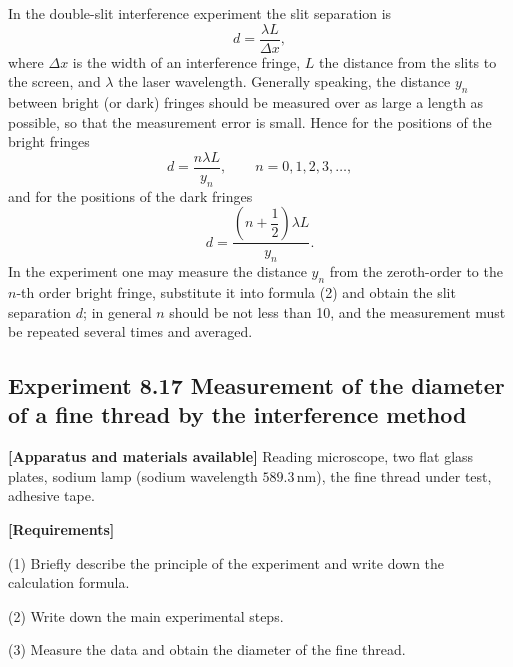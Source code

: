 In the double-slit interference experiment the slit separation is
\begin{equation}
d=\frac{\lambda L}{\Delta x}, \tag{1}
\end{equation}
where $\Delta x$ is the width of an interference fringe, $L$ the distance from the slits to the screen, and $\lambda$ the laser wavelength. Generally speaking, the distance $y_n$ between bright (or dark) fringes should be measured over as large a length as possible, so that the measurement error is small. Hence for the positions of the bright fringes
\begin{equation}
d=\frac{n\lambda L}{y_n},\qquad n=0,1,2,3,\ldots, \tag{2}
\end{equation}
and for the positions of the dark fringes
\begin{equation}
d=\frac{\left(n+\dfrac12\right)\lambda L}{y_n}. \tag{3}
\end{equation}
In the experiment one may measure the distance $y_n$ from the zeroth-order to the $n$-th order bright fringe, substitute it into formula (2) and obtain the slit separation $d$; in general $n$ should be not less than 10, and the measurement must be repeated several times and averaged.

\subsection*{Experiment 8.17 \quad Measurement of the diameter of a fine thread by the interference method}

\textbf{[Apparatus and materials available]} Reading microscope, two flat glass plates, sodium lamp (sodium wavelength $589.3\,\mathrm{nm}$), the fine thread under test, adhesive tape.

\textbf{[Requirements]}

(1) Briefly describe the principle of the experiment and write down the calculation formula.

(2) Write down the main experimental steps.

(3) Measure the data and obtain the diameter of the fine thread.

